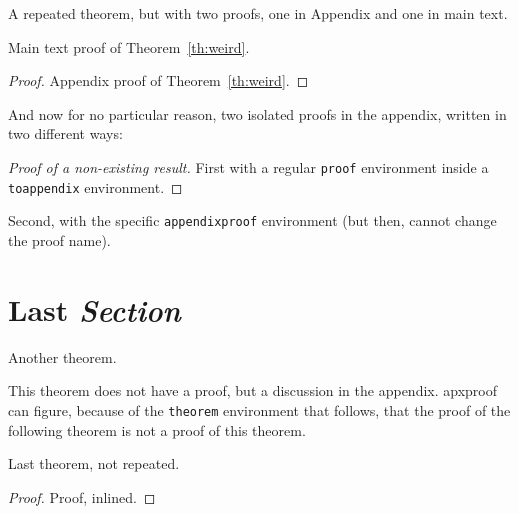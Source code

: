 \begin{theoremrep}
  \label{th:weird}%
  A repeated theorem, but with two proofs, one in Appendix and one in
  main text.
\end{theoremrep}

\begin{inlineproof}
  Main text proof of Theorem~\ref{th:weird}.
\end{inlineproof}

\begin{proof}
  Appendix proof of Theorem~\ref{th:weird}.
\end{proof}

\begin{toappendix}
And now for no particular reason, two isolated proofs in the appendix,
  written in two different ways:

  \begin{proof}[Proof of a non-existing result]
    First with a regular \texttt{proof} environment inside a
    \texttt{toappendix} environment.
  \end{proof}
\end{toappendix}

\begin{appendixproof}
  Second, with the specific \texttt{appendixproof} environment (but then,
  cannot change the proof name).
\end{appendixproof}

\section{Last \textit{Section}}

\begin{theoremrep}
  Another theorem.
\end{theoremrep}

\begin{toappendix}
  This theorem does not have a proof, but a discussion in the appendix.
  \textsf{apxproof} can figure, because of the \verb|theorem| environment
  that follows, that the proof of the following theorem is not a proof of
  this theorem.
\end{toappendix}

\begin{theorem}
  Last theorem, not repeated.
\end{theorem}

\begin{proof}
  Proof, inlined.
\end{proof}





